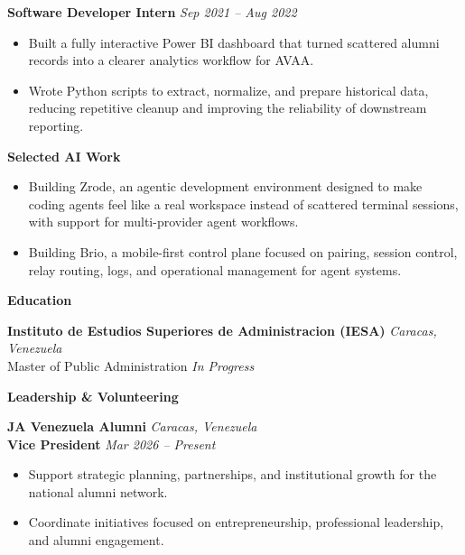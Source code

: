 \documentclass[11pt]{article}
\begin{document}
\textbf{Software Developer Intern} \hfill \textit{Sep 2021 -- Aug 2022}
\begin{itemize}
    \item Built a fully interactive Power BI dashboard that turned scattered alumni records into a clearer analytics workflow for AVAA.
    \item Wrote Python scripts to extract, normalize, and prepare historical data, reducing repetitive cleanup and improving the reliability of downstream reporting.
\end{itemize}
\vspace{8pt}
\begin{center}
    \textbf{Selected AI Work}
\end{center}
\vspace{-4pt}
\begin{itemize}
    \item Building Zrode, an agentic development environment designed to make coding agents feel like a real workspace instead of scattered terminal sessions, with support for multi-provider agent workflows.
    \item Building Brio, a mobile-first control plane focused on pairing, session control, relay routing, logs, and operational management for agent systems.
\end{itemize}
\vspace{8pt}
\begin{center}
    \textbf{Education}
\end{center}
\vspace{-4pt}
\textbf{Instituto de Estudios Superiores de Administracion (IESA)} \hfill \textit{Caracas, Venezuela} \\
Master of Public Administration \hfill \textit{In Progress}
\vspace{8pt}
\begin{center}
    \textbf{Leadership \& Volunteering}
\end{center}
\vspace{-4pt}
\textbf{JA Venezuela Alumni} \hfill \textit{Caracas, Venezuela} \\
\textbf{Vice President} \hfill \textit{Mar 2026 -- Present}
\begin{itemize}
    \item Support strategic planning, partnerships, and institutional growth for the national alumni network.
    \item Coordinate initiatives focused on entrepreneurship, professional leadership, and alumni engagement.
\end{itemize}
\end{document}

